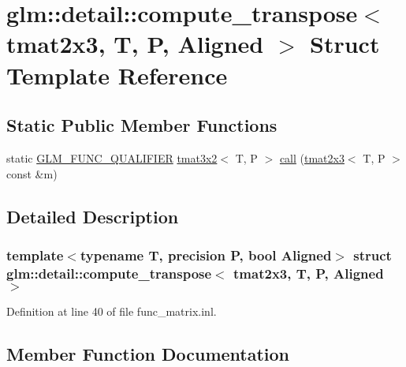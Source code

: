 \hypertarget{structglm_1_1detail_1_1compute__transpose_3_01tmat2x3_00_01_t_00_01_p_00_01_aligned_01_4}{}\section{glm\+::detail\+::compute\+\_\+transpose$<$ tmat2x3, T, P, Aligned $>$ Struct Template Reference}
\label{structglm_1_1detail_1_1compute__transpose_3_01tmat2x3_00_01_t_00_01_p_00_01_aligned_01_4}
\subsection*{Static Public Member Functions}
\begin{DoxyCompactItemize}
\item 
static \mbox{\hyperlink{setup_8hpp_a33fdea6f91c5f834105f7415e2a64407}{G\+L\+M\+\_\+\+F\+U\+N\+C\+\_\+\+Q\+U\+A\+L\+I\+F\+I\+ER}} \mbox{\hyperlink{structglm_1_1tmat3x2}{tmat3x2}}$<$ T, P $>$ \mbox{\hyperlink{structglm_1_1detail_1_1compute__transpose_3_01tmat2x3_00_01_t_00_01_p_00_01_aligned_01_4_af133a98bdc0c3968b2a3f0119388ff9e}{call}} (\mbox{\hyperlink{structglm_1_1tmat2x3}{tmat2x3}}$<$ T, P $>$ const \&m)
\end{DoxyCompactItemize}


\subsection{Detailed Description}
\subsubsection*{template$<$typename T, precision P, bool Aligned$>$\newline
struct glm\+::detail\+::compute\+\_\+transpose$<$ tmat2x3, T, P, Aligned $>$}



Definition at line 40 of file func\+\_\+matrix.\+inl.



\subsection{Member Function Documentation}
\mbox{\label{structglm_1_1detail_1_1compute__transpose_3_01tmat2x3_00_01_t_00_01_p_00_01_aligned_01_4_af133a98bdc0c3968b2a3f0119388ff9e}} 
